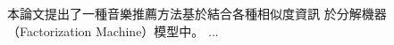 \begin{abstractCH}
%

\setlength{\baselineskip}{1.5em}
本論文提出了一種音樂推薦方法基於結合各種相似度資訊
於分解機器（Factorization Machine）模型中。
...
\end{abstractCH}
%

